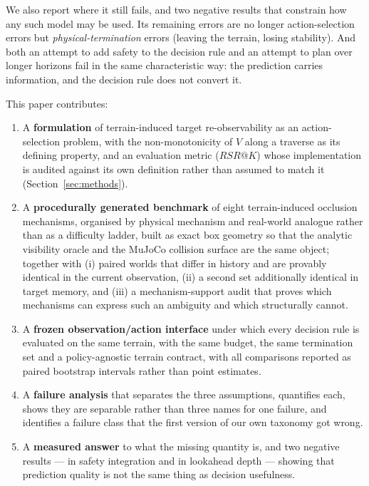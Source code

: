 \documentclass[utf8]{FrontiersinHarvard}
\begin{document}
We also report where it still fails, and two negative results that constrain how any
such model may be used. Its remaining errors are no longer action-selection errors but
\emph{physical-termination} errors (leaving the terrain, losing stability). And both an
attempt to add safety to the decision rule and an attempt to plan over longer horizons
fail in the same characteristic way: the prediction carries information, and the
decision rule does not convert it.

This paper contributes:

\begin{enumerate}
\item A \textbf{formulation} of terrain-induced target re-observability as an
action-selection problem, with the non-monotonicity of $V$ along a traverse as its
defining property, and an evaluation metric ($RSR@K$) whose implementation is audited
against its own definition rather than assumed to match it (Section~\ref{sec:methods}).
\item A \textbf{procedurally generated benchmark} of eight terrain-induced occlusion
mechanisms, organised by physical mechanism and real-world analogue rather than as a
difficulty ladder, built as exact box geometry so that the analytic visibility oracle
and the MuJoCo collision surface are the same object; together with (i) paired worlds
that differ in history and are provably identical in the current observation, (ii) a
second set additionally identical in target memory, and (iii) a mechanism-support audit
that proves which mechanisms can express such an ambiguity and which structurally
cannot.
\item A \textbf{frozen observation/action interface} under which every decision rule is
evaluated on the same terrain, with the same budget, the same termination set and a
policy-agnostic terrain contract, with all comparisons reported as paired bootstrap
intervals rather than point estimates.
\item A \textbf{failure analysis} that separates the three assumptions, quantifies each,
shows they are separable rather than three names for one failure, and identifies a
failure class that the first version of our own taxonomy got wrong.
\item A \textbf{measured answer} to what the missing quantity is, and two negative
results --- in safety integration and in lookahead depth --- showing that prediction
quality is not the same thing as decision usefulness.
\end{enumerate}
\end{document}
